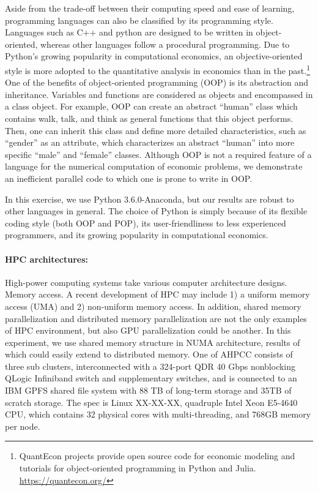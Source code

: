 \documentclass[12pt]{article}
\begin{document}
Aside from the trade-off between their computing speed and ease of learning, programming languages can also be classified by its programming style. Languages such as C++ and python are designed to be written in object-oriented, whereas other languages follow a procedural programming. Due to Python's growing popularity in computational economics, an objective-oriented style is more adopted to the quantitative analysis in economics than in the past.\footnote{\sf QuantEcon projects provide open source code for economic modeling and tutorials for object-oriented programming in Python and Julia. \url{https://quantecon.org/}} One of the benefits of object-oriented programming (OOP) is its abstraction and inheritance. Variables and functions are considered as objects and encompassed in a class object. For example, OOP can create an abstract ``human'' class which contains walk, talk, and think as general functions that this object performs. Then, one can inherit this class and define more detailed characteristics, such as ``gender'' as an attribute, which characterizes an abstract ``human'' into more specific ``male'' and ``female'' classes. Although OOP is not a required feature of a language for the numerical computation of economic problems, we demonstrate an inefficient parallel code to which one is prone to write in OOP.

In this exercise, we use Python 3.6.0-Anaconda, but our results are robust to other languages in general. The choice of Python is simply because of its flexible coding style (both OOP and POP), its user-friendliness to less experienced programmers, and its growing popularity in computational economics.


\paragraph{HPC architectures:} High-power computing systems take various computer architecture designs. Memory access. A recent development of HPC may include 1) a uniform memory access (UMA) and 2) non-uniform memory access. In addition, shared memory parallelization and distributed memory parallelization are not the only examples of HPC environment, but also GPU parallelization could be another. In this experiment, we use shared memory structure in NUMA architecture, results of which could easily extend to distributed memory. One of AHPCC consists of three sub clusters, interconnected with a 324-port QDR 40 Gbps nonblocking QLogic Infiniband switch and supplementary switches, and is connected to an IBM GPFS shared file system with 88 TB of long-term storage and 35TB of scratch storage. The spec is Linux XX-XX-XX, quadruple Intel Xeon E5-4640 CPU, which contains 32 physical cores with multi-threading, and 768GB memory per node.
\end{document}
